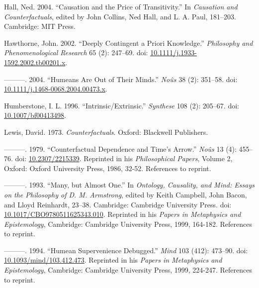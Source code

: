 \documentclass[
  10pt,
  letterpaper,
  DIV=11,
  numbers=noendperiod,
  twoside]{scrartcl}
\newlength{\cslhangindent}
\newenvironment{CSLReferences}[2] %
 {\begin{list}{}{%
  \setlength{\itemindent}{0pt}
  \setlength{\leftmargin}{0pt}
  \setlength{\parsep}{0pt}
  \ifodd #1
   \setlength{\leftmargin}{\cslhangindent}
   \setlength{\itemindent}{-1\cslhangindent}
  \fi
  \setlength{\itemsep}{#2\baselineskip}}}
 {\end{list}}
\begin{document}
\label{refs}
\begin{CSLReferences}{1}{0}
Hall, Ned. 2004. {``Causation and the Price of Transitivity.''} In
\emph{Causation and Counterfactuals}, edited by John Collins, Ned Hall,
and L. A. Paul, 181--203. Cambridge: MIT Press.

Hawthorne, John. 2002. {``Deeply Contingent a Priori Knowledge.''}
\emph{Philosophy and Phenomenological Research} 65 (2): 247--69. doi:
\href{https://doi.org/10.1111/j.1933-1592.2002.tb00201.x}{10.1111/j.1933-1592.2002.tb00201.x}.

---------. 2004. {``Humeans Are Out of Their Minds.''} \emph{No{û}s} 38
(2): 351--58. doi:
\href{https://doi.org/10.1111/j.1468-0068.2004.00473.x}{10.1111/j.1468-0068.2004.00473.x}.

Humberstone, I. L. 1996. {``Intrinsic/Extrinsic.''} \emph{Synthese} 108
(2): 205--67. doi:
\href{https://doi.org/10.1007/bf00413498}{10.1007/bf00413498}.

Lewis, David. 1973. \emph{Counterfactuals}. Oxford: Blackwell
Publishers.

---------. 1979. {``Counterfactual Dependence and Time's Arrow.''}
\emph{No{û}s} 13 (4): 455--76. doi:
\href{https://doi.org/10.2307/2215339}{10.2307/2215339}. Reprinted in
his \emph{Philosophical Papers}, Volume 2, Oxford: Oxford University
Press, 1986, 32-52. References to reprint.

---------. 1993. {``Many, but Almost One.''} In \emph{Ontology,
Causality, and Mind: Essays on the Philosophy of {D. M. Armstrong}},
edited by Keith Campbell, John Bacon, and Lloyd Reinhardt, 23--38.
Cambridge: Cambridge University Press. doi:
\href{https://doi.org/10.1017/CBO9780511625343.010}{10.1017/CBO9780511625343.010}.
Reprinted in his \emph{Papers in Metaphysics and Epistemology},
Cambridge: Cambridge University Press, 1999, 164-182. References to
reprint.

---------. 1994. {``Humean Supervenience Debugged.''} \emph{Mind} 103
(412): 473--90. doi:
\href{https://doi.org/10.1093/mind/103.412.473}{10.1093/mind/103.412.473}.
Reprinted in his \emph{Papers in Metaphysics and Epistemology},
Cambridge: Cambridge University Press, 1999, 224-247. References to
reprint.


\end{CSLReferences}
\end{document}

